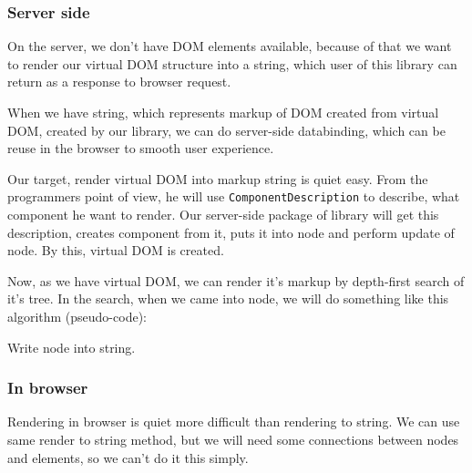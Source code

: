 \documentclass[oneside, 12pt]{book}
\begin{document}
    \subsubsection{Server side}\label{subsec:our-architecture-rendering-server}
      On the server, we don't have DOM elements available, 
      because of that we want to render our virtual DOM structure into a string,
      which user of this library can return as a response to browser request.

      When we have string, which represents markup of DOM created from virtual DOM, 
      created by our library, we can do server-side databinding, 
      which can be reuse in the browser to smooth user experience. 

      Our target, render virtual DOM into markup string is quiet easy.
      From the programmers point of view, he will use \texttt{ComponentDescription} to describe, 
      what component he want to render. 
      Our server-side package of library will get this description, creates component from it, 
      puts it into node and perform update of node. 
      By this, virtual DOM is created. 

      Now, as we have virtual DOM, we can render it's markup by depth-first search of it's tree. 
      In the search, when we came into node, we will do something like this algorithm (pseudo-code):
      \begin{algorithm}[H]
        \caption{Write node into string.}
      \end{algorithm}

    \subsubsection{In browser}\label{subsec:our-architecture-rendering-browser}
      Rendering in browser is quiet more difficult than rendering to string. 
      We can use same render to string method, but we will need some connections between nodes and elements, 
      so we can't do it this simply.
\end{document}

